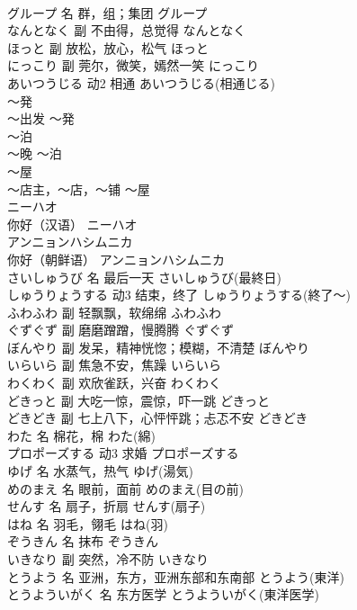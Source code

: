 \documentclass[8pt]{extreport}
\begin{document}
\begin{CJK}{UTF8}{min}
\\	グループ	名	群，组；集团	グループ	
\\	なんとなく	副	不由得，总觉得	なんとなく	
\\	ほっと	副	放松，放心，松气	ほっと	
\\	にっこり	副	莞尔，微笑，嫣然一笑	にっこり	
\\	あいつうじる	动2	相通	あいつうじる(相通じる)	
\\	～発	
\\	～出发	～発	
\\	～泊	
\\	～晚	～泊	
\\	～屋	
\\	～店主，～店，～铺	～屋	
\\	ニーハオ	
\\	你好（汉语）	ニーハオ	
\\	アンニョンハシムニカ	
\\	你好（朝鲜语）	アンニョンハシムニカ	
\\	さいしゅうび	名	最后一天	さいしゅうび(最終日)	
\\	しゅうりょうする	动3	结束，终了	しゅうりょうする(終了～)	
\\	ふわふわ	副	轻飘飘，软绵绵	ふわふわ	
\\	ぐずぐず	副	磨磨蹭蹭，慢腾腾	ぐずぐず	
\\	ぼんやり	副	发呆，精神恍惚；模糊，不清楚	ぼんやり	
\\	いらいら	副	焦急不安，焦躁	いらいら	
\\	わくわく	副	欢欣雀跃，兴奋	わくわく	
\\	どきっと	副	大吃一惊，震惊，吓一跳	どきっと	
\\	どきどき	副	七上八下，心怦怦跳；忐忑不安	どきどき	
\\	わた	名	棉花，棉	わた(綿)	
\\	プロポーズする	动3	求婚	プロポーズする	
\\	ゆげ	名	水蒸气，热气	ゆげ(湯気)	
\\	めのまえ	名	眼前，面前	めのまえ(目の前)	
\\	せんす	名	扇子，折扇	せんす(扇子)	
\\	はね	名	羽毛，翎毛	はね(羽)	
\\	ぞうきん	名	抹布	ぞうきん	
\\	いきなり	副	突然，冷不防	いきなり	
\\	とうよう	名	亚洲，东方，亚洲东部和东南部	とうよう(東洋)	
\\	とうよういがく	名	东方医学	とうよういがく(東洋医学)	

\end{CJK}
\end{document}

